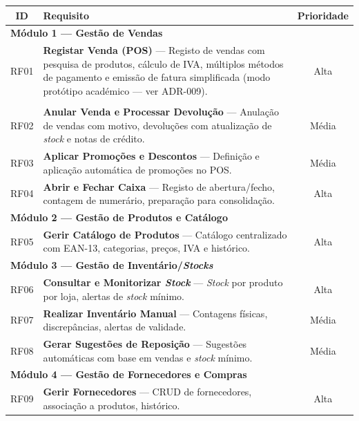     \begin{table}[H]
    \centering
    \small
    \begin{tabular}{|c|p{11.5cm}|c|}
    \hline
    \textbf{ID} & \textbf{Requisito} & \textbf{Prioridade} \\
    \hline
    \multicolumn{3}{|l|}{\cellcolor{gray!15}\textbf{Módulo 1 --- Gestão de Vendas}} \\
    \hline
    RF01 & \textbf{Registar Venda (POS)} --- Registo de vendas com pesquisa de produtos, cálculo de IVA, múltiplos métodos de pagamento e emissão de fatura simplificada (modo protótipo académico --- ver ADR-009). & Alta \\ \\
    \hline
    RF02 & \textbf{Anular Venda e Processar Devolução} --- Anulação de vendas com motivo, devoluções com atualização de \textit{stock} e notas de crédito. & Média \\
    \hline
    RF03 & \textbf{Aplicar Promoções e Descontos} --- Definição e aplicação automática de promoções no POS. & Média \\
    \hline
    RF04 & \textbf{Abrir e Fechar Caixa} --- Registo de abertura/fecho, contagem de numerário, preparação para consolidação. & Alta \\
    \hline
    \multicolumn{3}{|l|}{\cellcolor{gray!15}\textbf{Módulo 2 --- Gestão de Produtos e Catálogo}} \\
    \hline
    RF05 & \textbf{Gerir Catálogo de Produtos} --- Catálogo centralizado com EAN-13, categorias, preços, IVA e histórico. & Alta \\
    \hline
    \multicolumn{3}{|l|}{\cellcolor{gray!15}\textbf{Módulo 3 --- Gestão de Inventário/\textit{Stocks}}} \\
    \hline
    RF06 & \textbf{Consultar e Monitorizar \textit{Stock}} --- \textit{Stock} por produto por loja, alertas de \textit{stock} mínimo. & Alta \\
    \hline
    RF07 & \textbf{Realizar Inventário Manual} --- Contagens físicas, discrepâncias, alertas de validade. & Média \\
    \hline
    RF08 & \textbf{Gerar Sugestões de Reposição} --- Sugestões automáticas com base em vendas e \textit{stock} mínimo. & Média \\
    \hline
    \multicolumn{3}{|l|}{\cellcolor{gray!15}\textbf{Módulo 4 --- Gestão de Fornecedores e Compras}} \\
    \hline
    RF09 & \textbf{Gerir Fornecedores} --- CRUD de fornecedores, associação a produtos, histórico. & Alta \\

\end{tabular}
\end{table}

